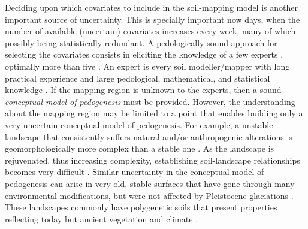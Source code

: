 Deciding upon which covariates to include in the soil-mapping model is another important source of 
uncertainty. This is specially important now days, when the number of available (uncertain) 
covariates increases every week, many of which possibly being statistically redundant. A 
pedologically sound approach for selecting the covariates consists in eliciting the knowledge of a 
few experts \citep{LarkEtAl2007a}, optimally more than five \citep{MeyerEtAl2001}. An expert is 
every soil modeller/mapper with long practical experience and large pedological, mathematical, and 
statistical knowledge \citep{MeyerEtAl2001}. If the mapping region is unknown to the experts, then
a sound \textit{conceptual model of pedogenesis} must be provided. However, the understanding
about the mapping region may be limited to a point that enables building only a very uncertain 
conceptual model of pedogenesis. For example, a unstable landscape that consistently suffers natural
and/or anthropogenic alterations is geomorphologically more complex than a stable one 
\citep{Schumm1979}. As the landscape is rejuvenated, thus increasing complexity, establishing 
soil-landscape relationships becomes very difficult \citep{StreckEtAl2008}. Similar uncertainty 
in the conceptual model of pedogenesis can arise in very old, stable surfaces that have gone 
through many environmental modifications, but were not affected by Pleistocene glaciations 
\citep{MckenzieEtAl2006}. These landscapes commonly have polygenetic soils that present properties
reflecting today but ancient vegetation and climate \citep{PainEtAl1995, Ker1998}.

